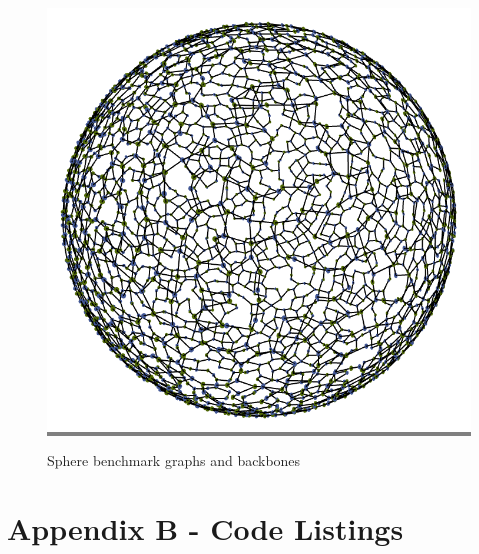 \documentclass{article}
\begin{document}
\begin{figure}
\begin{minipage}{0.3\textwidth}
    \end{minipage}
    \hspace{\fill}
    \begin{minipage}{0.3\textwidth}
    \colorbox{gray}{\includegraphics[width=\linewidth]{./images/sphere_2_bb_1.png}}
    \end{minipage}
    \vskip 0.1in

    \caption{Sphere benchmark graphs and backbones}
    \label{spheres}
\end{figure}

\newpage

\section{Appendix B - Code Listings}

\lstset{style=codestyle}




\end{document}
